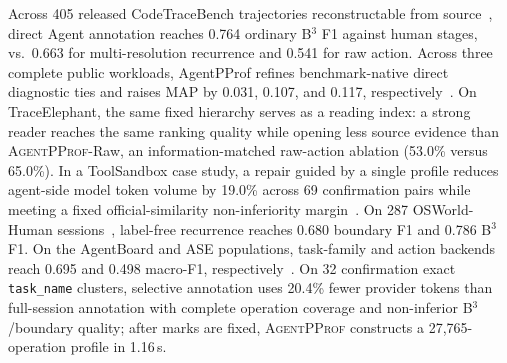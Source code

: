 \documentclass[letterpaper]{article}
\newcommand{\sys}{\textsc{AgentPProf}\xspace}
\begin{document}
Across 405 released CodeTraceBench trajectories reconstructable from
source~\cite{li2026codetracer},
direct Agent annotation reaches 0.764 ordinary B$^3$ F1 against human
stages, vs.\ 0.663 for multi-resolution recurrence and 0.541 for raw
action.
Across three complete public workloads, AgentPProf refines benchmark-native
direct diagnostic ties and raises MAP by 0.031, 0.107, and 0.117,
respectively~\cite{agentprocessbench,hintbench,traceelephant}.
On TraceElephant, the same fixed hierarchy serves as a reading index:
a strong reader reaches the same ranking quality while opening less
source evidence than \sys-Raw, an information-matched raw-action ablation
(53.0\% versus 65.0\%).
In a ToolSandbox case study, a repair guided by a single profile reduces
agent-side model token volume by 19.0\% across 69 confirmation pairs while
meeting a fixed official-similarity non-inferiority margin~\cite{toolsandbox}.
On 287 OSWorld-Human sessions~\cite{osworldhuman}, label-free
recurrence reaches 0.680 boundary F1 and 0.786 B$^3$ F1. On the AgentBoard and
ASE populations, task-family and action backends reach 0.695 and 0.498
macro-F1, respectively~\cite{agentboard,bouzenia-pradel-2025-trajectories}.
On 32 confirmation exact \texttt{task\_name} clusters, selective annotation
uses 20.4\% fewer provider tokens than full-session annotation with complete
operation coverage and non-inferior B$^3$/boundary quality; after marks are
fixed, \sys constructs a 27{,}765-operation profile in 1.16\,s.
\end{document}
